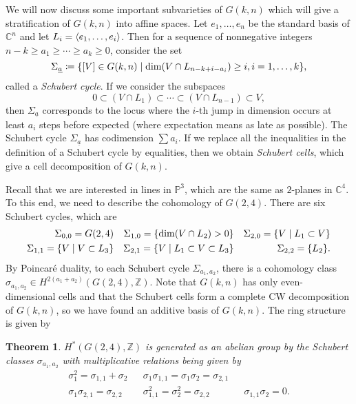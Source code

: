 \documentclass{amsart}
\newtheorem{thm}{Theorem}[section]
\theoremstyle{definition}
\theoremstyle{remark}
\theoremstyle{plain}
\theoremstyle{definition}
\theoremstyle{remark}
\newcommand{\C}{\mathbb{C}}
\newcommand{\Z}{\mathbb{Z}}
\renewcommand{\P}{\mathbb{P}}
\newcommand{\ul}[1]{\underline{#1}}
\newcommand{\1}{\mathbf{1}}
\newcommand{\2}{\mathbf{2}}
\newcommand{\3}{\mathbf{3}}
\begin{document}
We will now discuss some important subvarieties of $G(k, n)$ which will give a stratification of $G(k, n)$ into affine spaces. Let $e_1, \ldots, e_n$ be the standard basis of $\C^n$ and let $L_i = \ev{e_1, \ldots, e_i}$. Then for a sequence of nonnegative integers $n-k \geq a_1 \geq \cdots \geq a_k \geq 0$, consider the set
\[ \Sigma_{\ul{a}} \coloneqq \qty{[V] \in G(k, n) \mid \dim (V \cap L_{n-k+i-a_i}) \geq i, i = 1, \ldots, k}, \]
called a \textit{Schubert cycle}. If we consider the subspaces
\[ 0 \subset (V \cap L_1) \subset \cdots \subset (V \cap L_{n-1}) \subset V, \]
then $\Sigma_{\ul{a}}$ corresponds to the locus where the $i$-th jump in dimension occurs at least $a_i$ steps before expected (where expectation means as late as possible). The Schubert cycle $\Sigma_{\ul{a}}$ has codimension $\sum a_i$. If we replace all the inequalities in the definition of a Schubert cycle by equalities, then we obtain \textit{Schubert cells}, which give a cell decomposition of $G(k, n)$.

Recall that we are interested in lines in $\P^3$, which are the same as $2$-planes in $\C^4$. To this end, we need to describe the cohomology of $G(2,4)$. There are six Schubert cycles, which are
\begin{align*}
    \Sigma_{0,0} = G(2,4) & & \Sigma_{1,0} = \qty{\dim (V \cap L_2) > 0} & & \Sigma_{2,0} = \qty{V \mid L_1 \subset V} \\
    \Sigma_{1,1} = \qty{V \mid V \subset L_3} & & \Sigma_{2,1} = \qty{V \mid L_1 \subset V \subset L_3} & & \Sigma_{2,2} = \qty{L_2}.
\end{align*}
By Poincar\'e duality, to each Schubert cycle $\Sigma_{a_1, a_2}$, there is a cohomology class $\sigma_{a_1, a_2} \in H^{2(a_1+a_2)}(G(2, 4), \Z)$. Note that $G(k, n)$ has only even-dimensional cells and that the Schubert cells form a complete CW decomposition of $G(k,n)$, so we have found an additive basis of $G(k, n)$. The ring structure is given by

\begin{thm}
    $H^*(G(2,4), \Z)$ is generated as an abelian group by the Schubert classes $\sigma_{a_1, a_2}$ with multiplicative relations being given by 
    \begin{align*}
        \sigma_1^2 = \sigma_{1,1} + \sigma_{2} && \sigma_1 \sigma_{1,1} = \sigma_1 \sigma_2 = \sigma_{2,1} \\
        \sigma_1 \sigma_{2,1} = \sigma_{2,2} && \sigma_{1,1}^2 = \sigma_2^2 = \sigma_{2,2} && \sigma_{1,1} \sigma_2 = 0. 
    \end{align*}
\end{thm}
\end{document}
